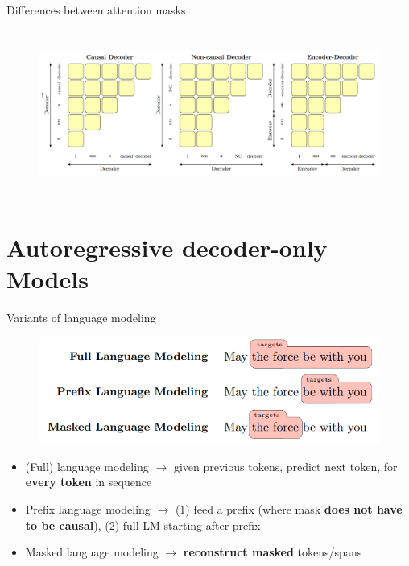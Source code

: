 \documentclass[12pt,aspectratio=169,handout]{beamer}
\begin{document}
\begin{frame}{Differences between attention masks}
	\begin{figure}[h]
		\includegraphics[height=5.5cm]{attention-patterns}
	\end{figure}
\end{frame}

\section{Autoregressive decoder-only Models}

\begin{frame}{Variants of language modeling}
	\begin{figure}[h]
		\includegraphics[height=3.5cm]{language-modeling-types}
	\end{figure}

	\begin{itemize}
		\item (Full) language modeling $\to$ given previous tokens, predict next token, for \textbf{every token} in sequence
		\pause
		\item Prefix language modeling $\to$ (1) feed a prefix (where mask \textbf{does not have to be causal}), (2) full LM starting after prefix
		\pause
		\item Masked language modeling $\to$ \textbf{reconstruct masked} tokens/spans
	\end{itemize}
	
\end{frame}
\end{document}
